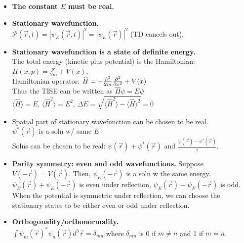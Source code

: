 \begin{itemize}[noitemsep,wide=0pt, leftmargin=\dimexpr{} + 2\relax]
    \item \textbf{The constant $E$ must be real.}
    
    \item \textbf{Stationary wavefunction.} \\
        $\mathcal{P}(\vec{r}, t) = |\psi_E(\vec{r}, t)|^2 = |\psi_E(\vec{r})|^2$ (TD cancels out).

    \item \textbf{Stationary wavefunction is a state of definite energy.} \\
        The total energy (kinetic plus potential) is the Hamiltonian: $H(x, p) = \frac{p^2}{2m} + V(x)$. \\

        Hamiltonian operator: $\widehat{H} = -\frac{\hbar^2}{2m} \pdv[2]{}{x} + V(x)$ \\
        Thus the TISE can be written as $\widehat{H} \psi = E \psi$ \\

        $\langle \widehat{H} \rangle = E$, $\langle \widehat{H} ^2 \rangle = E^2$, $\Delta E = \sqrt{\langle \widehat{H}^2 \rangle - \langle \widehat{H} \rangle ^2} = 0$

    \item Spatial part of stationary wavefunction can be chosen to be real. \\
        $\psi^*(\vec{r})$ is a soln w/ same $E$ \\
        Solns can be chosen to be real: $\psi(\vec{r}) + \psi^*(\vec{r})$ and $\frac{\psi(\vec{r}) - \psi^*(\vec{r})}{i}$.

    \item \textbf{Parity symmetry: even and odd wavefunctions.}
        Suppose $V(-\vec{r}) = V(\vec{r})$. Then, $\psi_E(-\vec{r})$ is a soln w the same energy. \\
        $\psi_E(\vec{r}) + \psi_E(-\vec{r})$ is even under reflection, $\psi_E(\vec{r}) - \psi_E(-\vec{r})$ is odd. \\
        When the potential is symmetric under reflection, we can choose the stationary states to be either even or odd under reflection.

    \item \textbf{Orthogonality/orthonormality.} \\
        $\int \psi_m (\vec{r})^* \psi_n (\vec{r}) d^3 \vec{r} = \delta_{mn}$ where $\delta_{mn}$ is 0 if $m \neq n$ and 1 if $m = n$.


\end{itemize}
